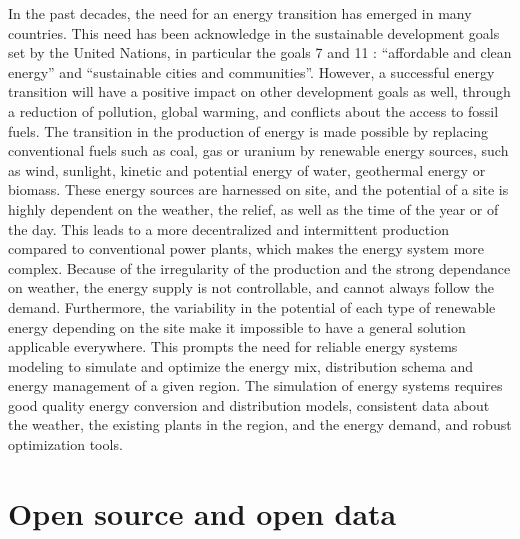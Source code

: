 In the past decades, the need for an energy transition has emerged in many countries. This need has been acknowledge in the sustainable development goals \cite{un_sdgs} set by the United Nations, in particular the goals 7 \cite{un_sdg7} and 11 \cite{un_sdg11} : ``affordable and clean energy'' and ``sustainable cities and communities''. However, a successful energy transition will have a positive impact on other development goals as well, through a reduction of pollution, global warming, and conflicts about the access to fossil fuels. \newline
The transition in the production of energy is made possible by replacing conventional fuels such as coal, gas or uranium by renewable energy sources, such as wind, sunlight, kinetic and potential energy of water, geothermal energy or biomass. These energy sources are harnessed on site, and the potential of a site is highly dependent on the weather, the relief, as well as the time of the year or of the day. This leads to a more decentralized and intermittent production compared to conventional power plants, which makes the energy system more complex. \newline
Because of the irregularity of the production and the strong dependance on weather, the energy supply is not controllable, and cannot always follow the demand. Furthermore, the variability in the potential of each type of renewable energy depending on the site make it impossible to have a general solution applicable everywhere. This prompts the need for reliable energy systems modeling to simulate and optimize the energy mix, distribution schema and energy management of a given region. The simulation of energy systems requires good quality energy conversion and distribution models, consistent data about the weather, the existing plants in the region, and the energy demand, and robust optimization tools.


\section{Open source and open data}

